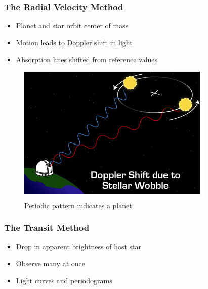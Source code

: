 \documentclass[xetex,mathserif,serif]{beamer}
\begin{document}
\begin{frame}
    \frametitle{The Radial Velocity Method}
    \begin{itemize}[<+->]
        \item Planet and star orbit center of mass
        \item Motion leads to Doppler shift in light
        \item Absorption lines shifted from reference values
    \end{itemize}
\end{frame}

\begin{frame}
    \begin{figure}
        \centering
        \includegraphics[height=0.8\textheight]{images/doppler1}
        \caption{Periodic pattern indicates a planet.}
    \end{figure}
\end{frame}

\begin{frame}
    \frametitle{The Transit Method}
    \begin{itemize}[<+->]
        \item Drop in apparent brightness of host star
        \item Observe many at once
        \item Light curves and periodograms
    \end{itemize}
\end{frame}
\end{document}

